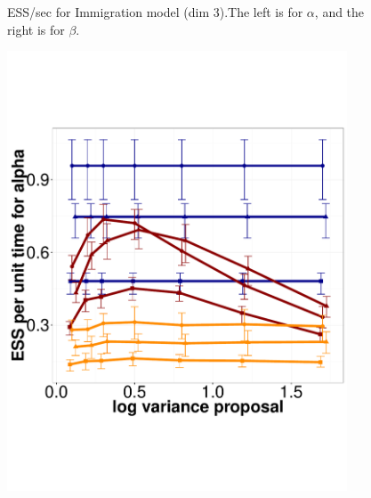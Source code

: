 \begin{figure}
\begin{minipage}[hp]{0.45\linewidth}
    \vspace{-0 in}
     \label{fig:ESS_Q_D3}
  \end{minipage}
    \caption{ESS/sec for Immigration model (dim 3).The left is for $\alpha$, and the right is for $\beta$.}
  \end{figure}

  \begin{figure}%
  \centering
  \begin{minipage}[!hp]{0.45\linewidth}
  \centering
    \includegraphics [width=0.90\textwidth, angle=0]{figs/q_10_alpha.pdf}
      \end{minipage}
  \begin{minipage}[hp]{0.45\linewidth}
  \centering

\end{minipage}
\end{figure}
